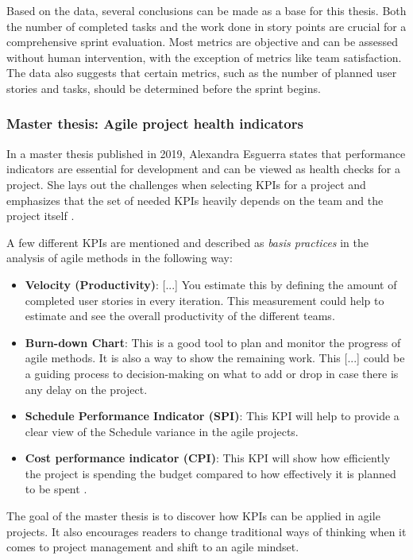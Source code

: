 Based on the data, several conclusions can be made as a base for this thesis.
Both the number of completed tasks and the work done in story
points are crucial for a comprehensive sprint evaluation. 
Most metrics are objective and can be assessed without human intervention, 
with the exception of metrics like team satisfaction. 
The data also suggests that certain metrics, such as the number of 
planned user stories and tasks, 
should be determined before the sprint begins.

\subsubsection*{Master thesis: Agile project health indicators}

In a master thesis published in 2019, Alexandra Esguerra states that 
performance indicators are essential for development and can be viewed as health checks for a project.
She lays out the challenges when selecting KPIs for a project and emphasizes that
the set of needed KPIs heavily depends on the team and the project itself \parencite{AgileProjectHealthIndicatorsThesis}.

A few different KPIs are mentioned and described as \textit{basis practices} in the analysis of agile methods in the following way:

\begin{itemize}
    \item \textbf{Velocity (Productivity)}: [...] You estimate this by defining the amount of completed user stories in every iteration. This measurement could help to estimate and see the overall productivity of the different teams.
    \item \textbf{Burn-down Chart}: This is a good tool to plan and monitor the progress of agile methods. It is also a way to show the remaining work. This [...] could be a guiding process to decision-making on what to add or drop in case there is any delay on the project.
    \item \textbf{Schedule Performance Indicator (SPI)}: This KPI will help to provide a clear view of the Schedule variance in the agile projects.
    \item \textbf{Cost performance indicator (CPI)}: This KPI will show how efficiently the project is spending the budget compared to how effectively it is planned to be spent \parencite{AgileProjectHealthIndicatorsThesis}.
\end{itemize}

The goal of the master thesis is to discover how KPIs can be applied in agile projects.
It also encourages readers to change traditional ways of thinking when it comes to project management
and shift to an agile mindset.

